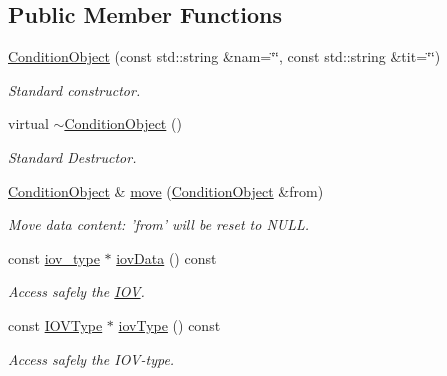 \subsection*{Public Member Functions}
\begin{DoxyCompactItemize}
\item 
\hyperlink{class_d_d4hep_1_1_conditions_1_1_interna_1_1_condition_object_a13a35738bc2b0cdcb5b276d628e1bef6}{ConditionObject} (const std::string \&nam=\char`\"{}\char`\"{}, const std::string \&tit=\char`\"{}\char`\"{})
\begin{DoxyCompactList}\small\item\em Standard constructor. \item\end{DoxyCompactList}\item 
virtual \hyperlink{class_d_d4hep_1_1_conditions_1_1_interna_1_1_condition_object_a37f67e8fcbbb726ba44d7f043ec5bcdf}{$\sim$ConditionObject} ()
\begin{DoxyCompactList}\small\item\em Standard Destructor. \item\end{DoxyCompactList}\item 
\hyperlink{class_d_d4hep_1_1_conditions_1_1_interna_1_1_condition_object}{ConditionObject} \& \hyperlink{class_d_d4hep_1_1_conditions_1_1_interna_1_1_condition_object_a2d944a3507299b38f69c5bd8b66494a5}{move} (\hyperlink{class_d_d4hep_1_1_conditions_1_1_interna_1_1_condition_object}{ConditionObject} \&from)
\begin{DoxyCompactList}\small\item\em Move data content: 'from' will be reset to NULL. \item\end{DoxyCompactList}\item 
const \hyperlink{class_d_d4hep_1_1_i_o_v}{iov\_\-type} $\ast$ \hyperlink{class_d_d4hep_1_1_conditions_1_1_interna_1_1_condition_object_ad46d00d120ed754bb26569c814b4b650}{iovData} () const 
\begin{DoxyCompactList}\small\item\em Access safely the \hyperlink{class_d_d4hep_1_1_i_o_v}{IOV}. \item\end{DoxyCompactList}\item 
const \hyperlink{class_d_d4hep_1_1_i_o_v_type}{IOVType} $\ast$ \hyperlink{class_d_d4hep_1_1_conditions_1_1_interna_1_1_condition_object_a4eef0b466f4cbc67041a29ba9b650fa1}{iovType} () const 
\begin{DoxyCompactList}\small\item\em Access safely the IOV-\/type. \item\end{DoxyCompactList}\item 

\end{DoxyCompactItemize}
